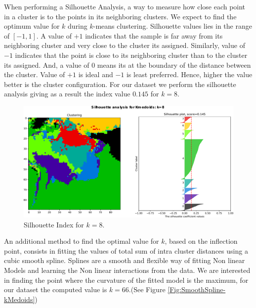 When performing a Silhouette Analysis, a way to measure how close each point in a cluster is to the points in its neighboring clusters. We expect to find the optimum value for $k$ during $k$-means clustering. Silhouette values lies in the range of $[-1, 1]$. A value of $+1$ indicates that the sample is far away from its neighboring cluster and very close to the cluster its assigned. Similarly, value of $-1$ indicates that the point is close to its neighboring cluster than to the cluster its assigned. And, a value of $0$ means its at the boundary of the distance between the cluster. Value of $+1$ is ideal and $-1$ is least preferred. Hence, higher the value better is the cluster configuration. For our dataset we perform the silhouette analysis giving as a result the index value $0.145$ for $k = 8$.
\begin{figure}[h]
	\centering
	\includegraphics[scale=0.50]{../Figures/silhouette-kmedoids_k8_seed0_lite}
	\caption{Silhouette Index for $k=8$.}
	\label{Fig:Silhouette-kMedoids}
\end{figure}

An additional method to find the optimal value for $k$, based on the inflection point, consists in fitting the values of total sum of intra cluster distances using a cubic smooth spline. Splines are a smooth and flexible way of fitting Non linear Models and learning the Non linear interactions from the data. We are interested in finding the point where the curvature of the fitted model is the maximum, for our dataset the computed value is $k = 66$.(See Figure \ref{Fig:SmoothSpline-kMedoids})

